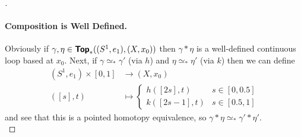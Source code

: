 \begin{proof}[]
  \paragraph{Composition is Well Defined.} Obviously if $\gamma,\eta\in\bm{\mathsf{Top}}_*((S^1,e_1),(X,x_0))$ then $\gamma\ast\eta$ is a well-defined continuous loop based at $x_0$. Next, if $\gamma\simeq_* \gamma'$ (via $h$) and $\eta\simeq_* \eta'$ (via $k$) then we can define \begin{align*}
    (S^1,e_1)\times [0,1] &\to (X,x_0) \\
    ([s],t) &\mapsto \begin{cases}
      h([2s],t) & s\in[0,0.5]\\
      k([2s-1],t) & s\in[0.5,1]
    \end{cases}
  \end{align*}
  and see that this is a pointed homotopy equivalence, so $\gamma\ast\eta\simeq_*\gamma'\ast\eta'$.\\


\end{proof}
